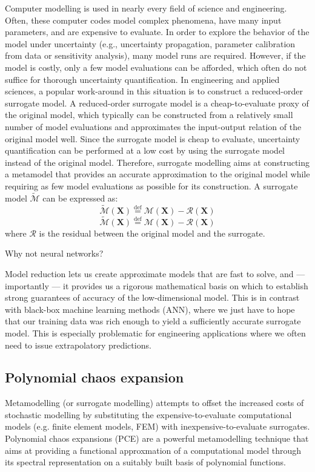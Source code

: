 Computer modelling is used in nearly every field of science and engineering. Often, these computer codes model complex phenomena, have many input parameters,
and are expensive to evaluate. In order to explore the behavior of the model under uncertainty (e.g., uncertainty propagation, parameter calibration from data or sensitivity analysis), many
model runs are required. However, if the model is costly, only a few model evaluations can be afforded, which often do not suffice for thorough uncertainty quantification. In engineering and applied sciences, a popular work-around in this situation is to construct a reduced-order surrogate model. A reduced-order surrogate model is a cheap-to-evaluate proxy of the original model, which typically can be constructed from a relatively small number of model evaluations and approximates
the input-output relation of the original model well. Since the surrogate model is cheap to evaluate, uncertainty quantification can be performed at a low cost by using the surrogate
model instead of the original model. Therefore, surrogate modelling aims at constructing a metamodel that provides an accurate approximation to the original model while requiring as few model evaluations as possible for its construction. A surrogate model $\tilde{\mathcal{M}}$ can be expressed as:
\begin{equation}
\label{eq:surrogate_model}
    \tilde{\mathcal{M}}(\boldsymbol{X})  \overset{\mathrm{def}}{=} \mathcal{M}(\boldsymbol{X}) - \mathcal{R}(\boldsymbol{X})
\end{equation}
\begin{equation}
\label{eq:surrogate_model}
    \tilde{\mathcal{M}}(\boldsymbol{X})  \overset{\mathrm{def}}{=} \mathcal{M}(\boldsymbol{X}) - \mathcal{R}(\boldsymbol{X})
\end{equation}
where $\mathcal{R}$ is the residual between the original model and the surrogate.

Why not neural networks?

Model reduction lets us create approximate models that are fast to solve, and — importantly — it provides us a rigorous mathematical basis on which to establish strong guarantees of accuracy of the low-dimensional model. This is in contrast with black-box machine learning methods (ANN), where we just have to hope that our training data was rich enough to yield a sufficiently accurate surrogate model. This is especially problematic for engineering applications where we often need to issue extrapolatory predictions.

\subsection{Polynomial chaos expansion}
Metamodelling (or surrogate modelling) attempts to offset the increased costs of stochastic modelling by substituting the expensive-to-evaluate computational models (e.g. finite element models, FEM) with inexpensive-to-evaluate surrogates.
Polynomial chaos expansions (PCE) are a powerful metamodelling technique that aims at providing a functional approxmation of a computational model through its spectral representation on a suitably built basis of polynomial functions.

